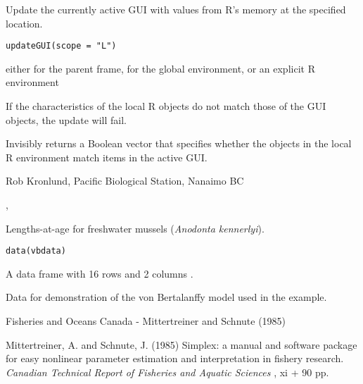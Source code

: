 \documentclass[letterpaper]{book}
\begin{document}
\begin{Description}\relax
Update the currently active GUI with values from R's memory at the specified location.
\end{Description}
\begin{Usage}
\begin{verbatim}
updateGUI(scope = "L")
\end{verbatim}
\end{Usage}
\begin{Arguments}
\begin{ldescription}
\item[\code{scope}] either  for the parent frame,  for the global environment,
or an explicit R environment
\end{ldescription}
\end{Arguments}
\begin{Details}\relax
If the characteristics of the local R objects do not match those of the GUI objects,
the update will fail.
\end{Details}
\begin{Value}
Invisibly returns a Boolean vector that specifies whether the objects in the local R
environment match items in the active GUI.
\end{Value}
\begin{Author}\relax
Rob Kronlund, Pacific Biological Station, Nanaimo BC
\end{Author}
\begin{SeeAlso}\relax
{}, 
\end{SeeAlso}

\begin{Description}\relax
Lengths-at-age for freshwater mussels (\emph{Anodonta kennerlyi}).
\end{Description}
\begin{Usage}
\begin{verbatim}data(vbdata)\end{verbatim}
\end{Usage}
\begin{Format}\relax
A data frame with 16 rows and 2 columns .
\end{Format}
\begin{Details}\relax
Data for demonstration of the von Bertalanffy model used in the 
 example.
\end{Details}
\begin{Source}\relax
Fisheries and Oceans Canada - Mittertreiner and Schnute (1985)
\end{Source}
\begin{References}\relax
Mittertreiner, A. and Schnute, J. (1985) Simplex: a manual and software package 
for easy nonlinear parameter estimation and interpretation in fishery research. 
\emph{Canadian Technical Report of Fisheries and Aquatic Sciences} , xi + 90 pp.
\end{References}
\end{document}
